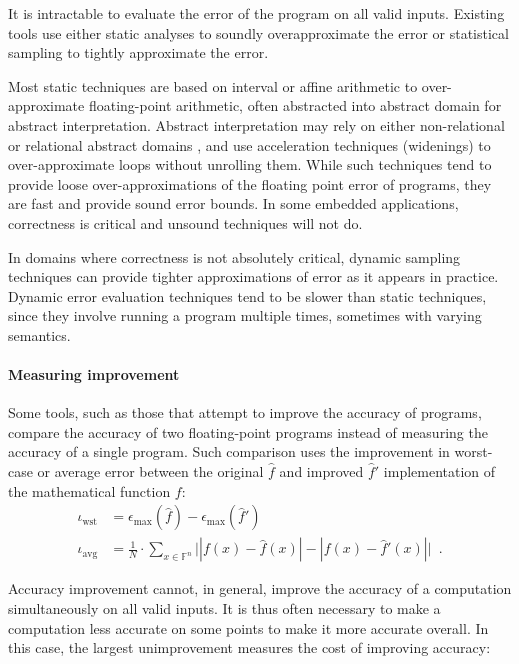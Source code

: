 \documentclass[main.tex]{subfiles}
\begin{document}
It is intractable to evaluate the error of the program on all valid inputs.
Existing tools use
  either static analyses to soundly overapproximate the error
  or statistical sampling to tightly approximate the error.

Most static techniques are based on interval or affine arithmetic
  to over-approximate floating-point arithmetic,
  often abstracted into abstract domain for abstract interpretation.
Abstract interpretation may rely on either non-relational \cite{}
  or relational abstract domains \cite{},
  and use acceleration techniques (widenings)
  to over-approximate loops without unrolling them.
While such techniques tend to provide loose over-approximations
of the floating point error of programs, they are fast and
provide sound error bounds. In some embedded applications,
correctness is critical and unsound techniques will not do.

In domains where correctness is not absolutely critical,
dynamic sampling techniques can provide tighter approximations of
error as it appears in practice. Dynamic error evaluation techniques
tend to be slower than static techniques, since they involve running a
program multiple times, sometimes with varying semantics.

\paragraph{Measuring improvement}

Some tools,
  such as those that attempt to improve the accuracy of programs,
  compare the accuracy of two floating-point programs
  instead of measuring the accuracy of a single program.
Such comparison uses the improvement in worst-case or average error
  between the original $\hat f$ and improved $\hat f'$ implementation
  of the mathematical function $f$:
\begin{align*}
\iota_{\text{wst}} &= \epsilon_{\text{max}}(\hat{f}) - \epsilon_{\text{max}}(\hat{f}') \\
\iota_{\text{avg}} &= \frac{1}{N} \cdot \sum_{x\in \mathbb{F}^n}  \big| |f(x)-\hat{f}(x)| - |f(x)-\hat{f}'(x)|  \big|\enspace .
\end{align*}

Accuracy improvement cannot, in general,
  improve the accuracy of a computation
  simultaneously on all valid inputs.
It is thus often necessary
  to make a computation less accurate on some points
  to make it more accurate overall.
In this case, the largest unimprovement
  measures the cost of improving accuracy:
\end{document}
